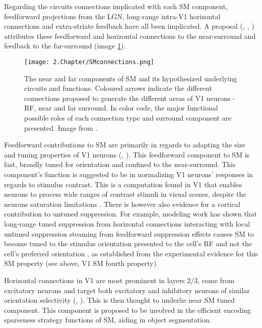 Regarding the circuits connections implicated with each SM component, feedforward projections from the LGN, long-range intra-V1 horizontal connections and extra-striate feedback have all been implicated. A proposal (\cite{Angelucci2002}, \cite{Angelucci2006}, \cite{Nurminen2014}) attributes these feedforward and horizontal connections to the near-surround and feedback to the far-surround (image \ref{SMconnections}).

\begin{figure}[H]
\center
\texttt{[image: 2.Chapter/SMconnections.png]}
\caption{The near and far components of SM and its hypothesized underlying circuits and functions. Coloured arrows indicate the different connections proposed to generate the different areas of V1 neurons - RF, near and far surround. In color code, the major functional possible roles of each connection type and surround component are presented.
\newline \newline \tiny{Image from \cite{Shushruth2013}.}}
\label{SMconnections}
\end{figure}

Feedforward contributions to SM are primarily in regards to adapting the size and tuning properties of V1 neurons (\cite{Hubel1962}, \cite{Angelucci2006}). This feedforward component to SM is fast, broadly tuned for orientation and confined to the near-surround. This component's function is suggested to be in normalizing V1 neurons' responses in regards to stimulus contrast. This is a computation found in V1 \cite{Heeger1992} that enables neurons to process wide ranges of contrast stimuli in visual scenes, despite the neurons saturation limitations \cite{Carandini2012}. There is however also evidence for a cortical contribution to untuned suppression. For example, modeling work has shown that long-range tuned suppression from horizontal connections interacting with local untuned suppression steaming from feedforward suppression effects causes SM to become tuned to the stimulus orientation presented to the cell's RF and not the cell's preferred orientation \cite{Shushruth2012}, as established from the experimental evidence for this SM property (see above, V1 SM fourth property).

Horizontal connections in V1 are most prominent in layers 2/3, come from excitatory neurons and target both excitatory and inhibitory neurons of similar orientation selectivity (\cite{Bosking1997}, \cite{Sincich2001}). This is then thought to underlie near SM tuned component. This component is proposed to be involved in the efficient encoding sparseness strategy functions of SM, aiding in object segmentation.

